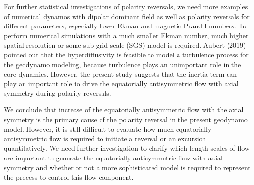 For further statistical investigations of polarity reversals, we need more examples of numerical dynamos with dipolar dominant field as well as polarity reversals for different parameters, especially lower Ekman and magnetic Prandtl numbers.
To perform numerical simulations with a much smaller Ekman number, much higher spatial resolution or some sub-grid scale (SGS) model is required. 
Aubert (2019) pointed out that the hyperdiffusivity is feasible to model a turbulence process for the geodynamo modeling, %
because turbulence plays an unimportant role in the core dynamics.
However, the present study suggests that the inertia term can play an important role to drive the equatorially antisymmetric flow with axial symmetry during polarity reversals.
%

We conclude that increase of the equatorially antisymmetric flow with the axial symmetry is the primary cause of the polarity reversal in the present geodynamo model. 
However, it is still difficult to evaluate how much equatorially antisymmetric flow is required to initiate a reversal or an excursion quantitatively.
We need further investigation to clarify which length scales of flow are important to generate the equatorially antisymmetric flow with axial symmetry and whether or not a more sophisticated model is required to represent the process to control this flow component.

%
